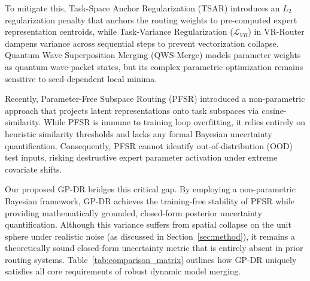 To mitigate this, Task-Space Anchor Regularization (TSAR) \cite{rostova2025tsar} introduces an $L_2$ regularization penalty that anchors the routing weights to pre-computed expert representation centroids, while Task-Variance Regularization ($\mathcal{L}_{VR}$) in VR-Router \cite{vance2025vrrouter} dampens variance across sequential steps to prevent vectorization collapse. Quantum Wave Superposition Merging (QWS-Merge) \cite{chen2024qws} models parameter weights as quantum wave-packet states, but its complex parametric optimization remains sensitive to seed-dependent local minima. 

Recently, Parameter-Free Subspace Routing (PFSR) \cite{leland2024pfsr} introduced a non-parametric approach that projects latent representations onto task subspaces via cosine-similarity. While PFSR is immune to training loop overfitting, it relies entirely on heuristic similarity thresholds and lacks any formal Bayesian uncertainty quantification. Consequently, PFSR cannot identify out-of-distribution (OOD) test inputs, risking destructive expert parameter activation under extreme covariate shifts. 

Our proposed GP-DR bridges this critical gap. By employing a non-parametric Bayesian framework, GP-DR achieves the training-free stability of PFSR while providing mathematically grounded, closed-form posterior uncertainty quantification. Although this variance suffers from spatial collapse on the unit sphere under realistic noise (as discussed in Section~\ref{sec:method}), it remains a theoretically sound closed-form uncertainty metric that is entirely absent in prior routing systems. Table~\ref{tab:comparison_matrix} outlines how GP-DR uniquely satisfies all core requirements of robust dynamic model merging.

